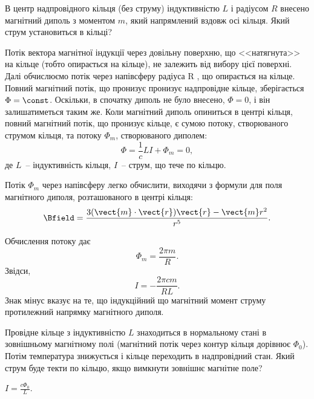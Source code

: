 \begin{problem}
В центр надпровідного кільця (без струму) індуктивністю $L$ і радіусом $R$ внесено магнітний диполь з
моментом $m$, який напрямлений вздовж осі кільця. Який струм установиться в кільці?
\begin{solution}
    Потік вектора магнітної індукції через довільну поверхню, що <<натягнута>> на кільце (тобто опирається на кільце), не залежить від вибору цієї поверхні. Далі обчислюємо потік через напівсферу радіуса R , що опирається на кільце.  Повний магнітний потік, що пронизує пронизує надпровідне кільце, зберігається $\Phi = \const$. Оскільки, в спочатку диполь не було внесено, $\Phi = 0$, і він залишатиметься таким же. Коли магнітний диполь опиниться в центрі кільця, повний магнітний потік, що пронизує кільце, є сумою потоку, створюваного струмом кільця, та потоку $\Phi_m$, створюваного диполем:
	\[
		\Phi = \frac1c LI + \Phi_m = 0,
	\]
	де $L$~-- індуктивність кільця, $I$~-- струм, що тече по кільцю.

Потік $\Phi_m$ через напівсферу легко обчислити, виходячи з формули для поля магнітного диполя, розташованого в центрі кільця:
\[
    \Bfield = \frac{3(\vect{m}\cdot\vect{r})\vect{r}- \vect{m}r^2}{r^5}.
\]

Обчислення потоку дає
\[
  \Phi_m = \frac{2\pi m}{R} .
\]
%
%
%
	Звідси,
	\[
		I = - \frac{ 2\pi c m}{RL}.
	\]
	Знак мінус вказує на те, що індукційний що магнітний момент струму протилежний напрямку магнітного диполя.
\end{solution}
\end{problem}


\begin{problem}
Провідне кільце з індуктивністю $L$ знаходиться в нормальному стані в зовнішньому магнітному полі (магнітний потік через контур кільця дорівнює $\Phi_0$). Потім температура знижується і кільце переходить в надпровідний стан. Який струм буде текти по кільцю, якщо вимкнути зовнішнє магнітне поле?
\begin{solution}
	$I = \frac{c\Phi_0}{L}$.
\end{solution}
\end{problem}

